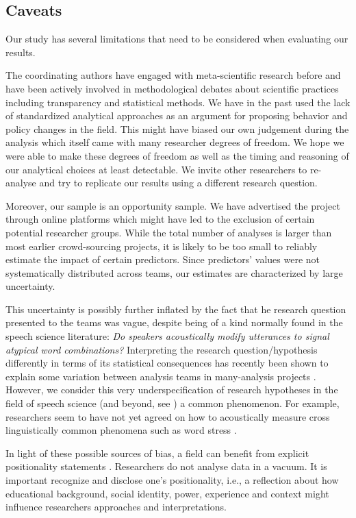\documentclass[Review,times,sageh]{sagej}
\begin{document}
\hypertarget{caveats}{%
\subsection{Caveats}\label{caveats}}

Our study has several limitations that need to be considered when evaluating our results.

The coordinating authors have engaged with meta-scientific research before and have been actively involved in methodological debates about scientific practices including transparency and statistical methods.
We have in the past used the lack of standardized analytical approaches as an argument for proposing behavior and policy changes in the field.
This might have biased our own judgement during the analysis which itself came with many researcher degrees of freedom.
We hope we were able to make these degrees of freedom as well as the timing and reasoning of our analytical choices at least detectable.
We invite other researchers to re-analyse and try to replicate our results using a different research question.

Moreover, our sample is an opportunity sample.
We have advertised the project through online platforms which might have led to the exclusion of certain potential researcher groups.
While the total number of analyses is larger than most earlier crowd-sourcing projects, it is likely to be too small to reliably estimate the impact of certain predictors.
Since predictors' values were not systematically distributed across teams, our estimates are characterized by large uncertainty.

This uncertainty is possibly further inflated by the fact that he research question presented to the teams was vague, despite being of a kind normally found in the speech science literature: \emph{Do speakers acoustically modify utterances to signal atypical word combinations?}
Interpreting the research question/hypothesis differently in terms of its statistical consequences has recently been shown to explain some variation between analysis teams in many-analysis projects \citep{auspurg2021has}.
However, we consider this very underspecification of research hypotheses in the field of speech science (and beyond, see \citet{scheel2022most}) a common phenomenon.
For example, researchers seem to have not yet agreed on how to acoustically measure cross linguistically common phenomena such as word stress \citep[e.g.][]{gordon2017acoustic}.

In light of these possible sources of bias, a field can benefit from explicit positionality statements \citep[e.g.,][\citet{darwin2020}, \citet{fox2021open}]{jafar2018}.
Researchers do not analyse data in a vacuum.
It is important recognize and disclose one's positionality, i.e., a reflection about how educational background, social identity, power, experience and context might influence researchers approaches and interpretations.
\end{document}

